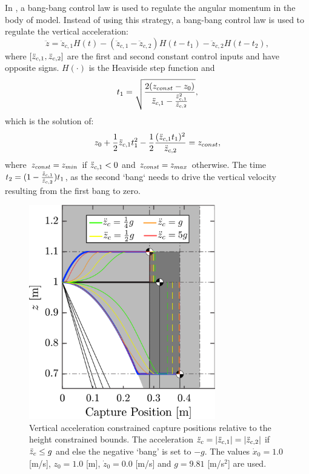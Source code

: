 In \cite{pratt2006capture,stephens2007humanoid,koolen2012capturability}, a bang-bang control law is used to regulate the angular momentum in the body of model. Instead of using this strategy, a bang-bang control law is used to regulate the vertical acceleration:
\begin{equation}
	\ddot{z} = \ddot{z}_{c,1}H(t) - (\ddot{z}_{c,1} - \ddot{z}_{c,2})H(t-t_1) - \ddot{z}_{c,2}H(t-t_2),
\end{equation}
where $[\ddot{z}_{c,1},\ddot{z}_{c,2}]$ are the first and second constant control inputs and have opposite signs. $H(\cdot)$ is the Heaviside step function and 
\begin{equation}
t_1=\sqrt{\frac{2(z_{const}-z_0)}{\ddot{z}_{c,1} - \frac{\ddot{z}_{c,1}^2}{\ddot{z}_{c,2}}}},
\end{equation}
which is the solution of:
\begin{equation}
	z_0+\frac{1}{2}\ddot{z}_{c,1} t_1^2 - \frac{1}{2}\frac{(\ddot{z}_{c,1} t_1)^2}{\ddot{z}_{c,2}}= z_{const},
\end{equation}
where $z_{const}=z_{min}$ if $\ddot{z}_{c,1} <0$ and $z_{const}=z_{max}$ otherwise. The time $t_2=(1-\frac{\ddot{z}_{c,1}}{\ddot{z}_{c,2}})t_1$, as the second `bang` needs to drive the vertical velocity resulting from the first bang to zero. 
\begin{figure}
      \centering
      \includegraphics[width=3.2in]{STYLESTUFF/CPLimitsForce.png}
      \caption{Vertical acceleration constrained capture positions relative to the height constrained bounds. The acceleration $\ddot{z}_{c}=|\ddot{z}_{c,1}|=|\ddot{z}_{c,2}|$ if $\ddot{z}_{c} \leq g$ and else the negative `bang' is set to $-g$. The values $\dot{x}_0=1.0$ [m/s], $z_0=1.0$ [m], $\dot{z}_0=0.0$ [m/s] and $g=9.81$ [m/s$^2$] are used.}
      \label{fig:zvsf}
\end{figure}


